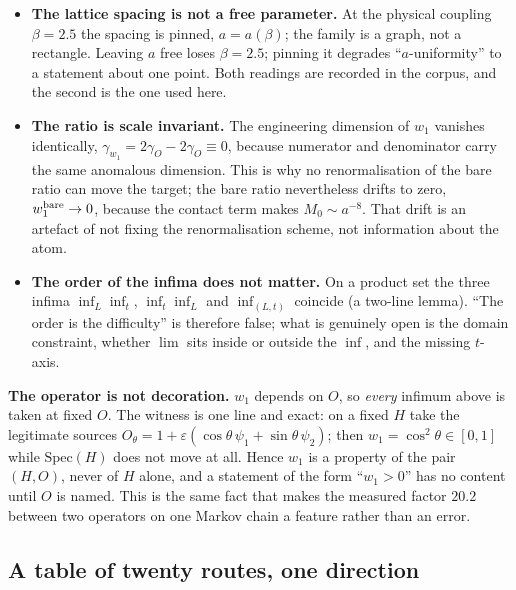 \begin{itemize}
\item \textbf{The lattice spacing is not a free parameter.} At the physical coupling
  $\beta=2.5$ the spacing is pinned, $a=a(\beta)$; the family is a graph, not a rectangle.
  Leaving $a$ free loses $\beta=2.5$; pinning it degrades ``$a$-uniformity'' to a
  statement about one point. Both readings are recorded in the corpus, and the second is
  the one used here.
\item \textbf{The ratio is scale invariant.} The engineering dimension of $w_1$ vanishes
  identically, $\gamma_{w_1}=2\gamma_O-2\gamma_O\equiv 0$, because numerator and
  denominator carry the same anomalous dimension. This is why no renormalisation of the
  bare ratio can move the target; the bare ratio nevertheless drifts to zero, $w_1^{\rm
  bare}\to0$, because the contact term makes $M_0\sim a^{-8}$. That drift is an artefact
  of not fixing the renormalisation scheme, not information about the atom.
\item \textbf{The order of the infima does not matter.} On a product set the three
  infima $\inf_L\inf_t$, $\inf_t\inf_L$ and $\inf_{(L,t)}$ coincide (a two-line lemma).
  ``The order is the difficulty'' is therefore false; what is genuinely open is the
  domain constraint, whether $\lim$ sits inside or outside the $\inf$, and the missing
  $t$-axis.
\end{itemize}

\begin{warnbox}
\textbf{The operator is not decoration.} $w_1$ depends on $O$, so \emph{every} infimum
above is taken at fixed $O$. The witness is one line and exact: on a fixed $H$ take the
legitimate sources $O_\theta=1+\varepsilon(\cos\theta\,\psi_1+\sin\theta\,\psi_2)$; then
$w_1=\cos^2\theta\in[0,1]$ while $\mathrm{Spec}(H)$ does not move at all. Hence $w_1$ is a
property of the pair $(H,O)$, never of $H$ alone, and a statement of the form ``$w_1>0$''
has no content until $O$ is named. This is the same fact that makes the measured factor
$20.2$ between two operators on one Markov chain a feature rather than an error.
\end{warnbox}

\subsection{A table of twenty routes, one direction}\label{sec:survey-table}

